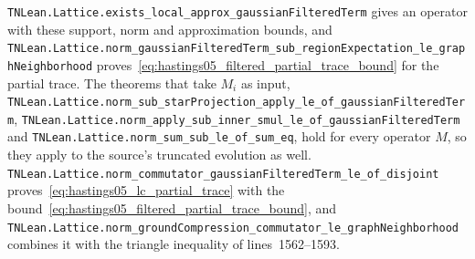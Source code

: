 \documentclass{article}
\providecommand{\leanid}[1]{\nolinkurl{#1}}
\begin{document}
\leanid{TNLean.Lattice.exists_local_approx_gaussianFilteredTerm} gives an
operator with these support, norm and approximation bounds, and
\leanid{TNLean.Lattice.norm_gaussianFilteredTerm_sub_regionExpectation_le_graphNeighborhood}
proves~\eqref{eq:hastings05_filtered_partial_trace_bound} for the partial
trace. The theorems that take $M_i$ as input,
\leanid{TNLean.Lattice.norm_sub_starProjection_apply_le_of_gaussianFilteredTerm},
\leanid{TNLean.Lattice.norm_apply_sub_inner_smul_le_of_gaussianFilteredTerm}
and \leanid{TNLean.Lattice.norm_sum_sub_le_of_sum_eq}, hold for every operator
$M$, so they apply to the source's truncated evolution as well.
\leanid{TNLean.Lattice.norm_commutator_gaussianFilteredTerm_le_of_disjoint}
proves~\eqref{eq:hastings05_lc_partial_trace} with the bound~\eqref{eq:hastings05_filtered_partial_trace_bound}, and
\leanid{TNLean.Lattice.norm_groundCompression_commutator_le_graphNeighborhood}
combines it with the triangle inequality of lines~1562--1593.



\end{document}
